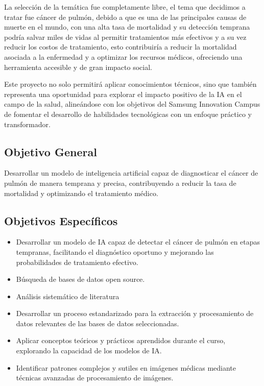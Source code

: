 La selección de la temática fue completamente libre, el tema que decidimos a tratar fue cáncer de pulmón, debido a que es una de las principales causas de muerte en el mundo, con una alta tasa de mortalidad y su detección temprana podría salvar miles de vidas al permitir tratamientos más efectivos y a su vez reducir los costos de tratamiento, esto contribuiría a reducir la mortalidad asociada a la enfermedad y a optimizar los recursos médicos, ofreciendo una herramienta accesible y de gran impacto social.

Este proyecto no solo permitirá aplicar conocimientos técnicos, sino que también representa una oportunidad para explorar el impacto positivo de la IA en el campo de la salud, alineándose con los objetivos del Samsung Innovation Campus de fomentar el desarrollo de habilidades tecnológicas con un enfoque práctico y transformador.\\


\subsection{Objetivo General}
Desarrollar un modelo de inteligencia artificial capaz de diagnosticar el cáncer de pulmón de manera temprana y precisa, contribuyendo a reducir la tasa de mortalidad y optimizando el tratamiento médico.\\
\subsection{Objetivos Específicos}
\begin{itemize}
    \item Desarrollar un modelo de IA capaz de detectar el cáncer de pulmón en etapas tempranas, facilitando el diagnóstico oportuno y mejorando las probabilidades de tratamiento efectivo.
    \item Búsqueda de bases de datos open source.
    \item Análisis sistemático de literatura 
    \item Desarrollar un proceso estandarizado para la extracción y procesamiento de datos relevantes de las bases de datos seleccionadas.
    \item  Aplicar conceptos teóricos y prácticos aprendidos durante el curso, explorando la capacidad de los modelos de IA.
    \item Identificar patrones complejos y sutiles en imágenes médicas mediante técnicas avanzadas de procesamiento de imágenes.
\end{itemize}

